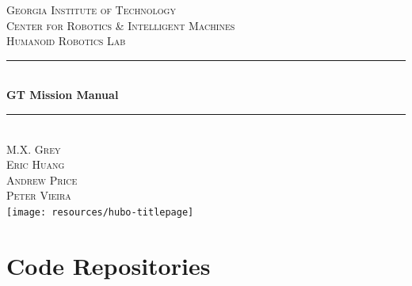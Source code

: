 \documentclass[letterpaper, 10 pt]{report}
\begin{document}
\begin{titlepage}
\center
\textsc{\LARGE Georgia Institute of Technology}\\[1.5cm]
\textsc{\large Center for Robotics \& Intelligent Machines}\\[0.5cm]
\textsc{\large Humanoid Robotics Lab}\\[0.5cm]
\rule{\linewidth}{0.5mm}\\[0.4cm]
{\huge \bfseries GT Mission Manual}\\[0.4cm]
\rule{\linewidth}{0.5mm}\\[1.5cm]
\textsc{\normalsize M.X. Grey}\\
\textsc{\normalsize Eric Huang}\\
\textsc{\normalsize Andrew Price}\\
\textsc{\normalsize Peter Vieira}\\[1.5cm]
\texttt{[image: resources/hubo-titlepage]}
\vfill
\end{titlepage}


%
\section*{Code Repositories}\label{sec:code-repos}
\end{document}
